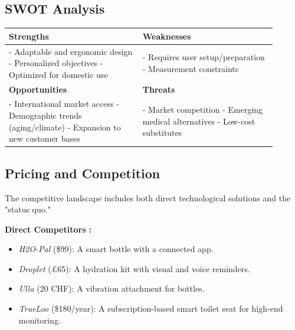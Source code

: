 \documentclass{article}
\begin{document}
\subsection{SWOT Analysis}
\begin{center}
\begin{tabular}{|p{0.45\linewidth}|p{0.45\linewidth}|}
\hline
\textbf{Strengths} & \textbf{Weaknesses} \\
\hline
- Adaptable and ergonomic design \newline - Personalized objectives \newline - Optimized for domestic use & - Requires user setup/preparation \newline - Measurement constraints \newline \\
\hline
\textbf{Opportunities} & \textbf{Threats} \\
\hline
- International market access \newline - Demographic trends (aging/climate) \newline - Expansion to new customer bases & - Market competition \newline - Emerging medical alternatives \newline - Low-cost substitutes \\
\hline
\end{tabular}
\end{center}

\subsection{Pricing and Competition}
\label{subsec:finance}

The competitive landscape includes both direct technological solutions and the "status quo."

\textbf{Direct Competitors :}
\begin{itemize}
    \item \textit{H2O-Pal} (\$99): A smart bottle with a connected app. \cite{H2OPal}
    \item \textit{Droplet} (£65): A hydration kit with visual and voice reminders. \cite{Droplet}
    \item \textit{Ulla} (20 CHF): A vibration attachment for bottles. \cite{Ulla}
    \item \textit{TrueLoo} (\$180/year): A subscription-based smart toilet seat for high-end monitoring. \cite{TrueLoo}
\end{itemize}
\end{document}
